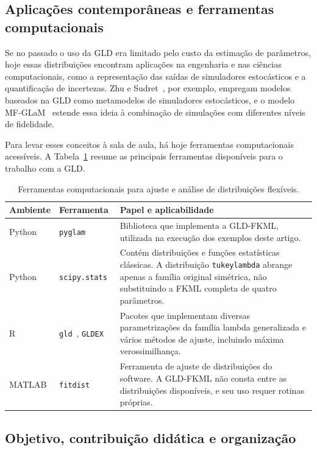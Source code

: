 \subsection{Aplicações contemporâneas e ferramentas computacionais}

Se no passado o uso da GLD era limitado pelo custo da estimação de parâmetros, hoje essas distribuições encontram aplicações na engenharia e nas ciências computacionais, como a representação das saídas de simuladores estocásticos e a quantificação de incertezas. Zhu e Sudret~\cite{zhu2021}, por exemplo, empregam modelos baseados na GLD como metamodelos de simuladores estocásticos, e o modelo MF-GLaM~\cite{giannoukou2026} estende essa ideia à combinação de simulações com diferentes níveis de fidelidade.

Para levar esses conceitos à sala de aula, há hoje ferramentas computacionais acessíveis. A Tabela~\ref{tab:ferramentas} resume as principais ferramentas disponíveis para o trabalho com a GLD.

\begin{table}[htbp]
\centering
\caption{Ferramentas computacionais para ajuste e análise de distribuições flexíveis.}
\label{tab:ferramentas}
\small
\begin{tabular}{p{1.6cm} p{3.1cm} p{9.3cm}}
\toprule
\textbf{Ambiente} & \textbf{Ferramenta} & \textbf{Papel e aplicabilidade} \\
\midrule
Python & \texttt{pyglam}~\cite{pyglam} & Biblioteca que implementa a GLD-FKML, utilizada na execução dos exemplos deste artigo. \\
Python & \texttt{scipy.stats}~\cite{scipy2020} & Contém distribuições e funções estatísticas clássicas. A distribuição \texttt{tukeylambda} abrange apenas a família original simétrica, não substituindo a FKML completa de quatro parâmetros. \\
R & \texttt{gld}~\cite{KingGld}, \texttt{GLDEX}~\cite{su2007} & Pacotes que implementam diversas parametrizações da família lambda generalizada e vários métodos de ajuste, incluindo máxima verossimilhança. \\
MATLAB & \texttt{fitdist}~\cite{matlabfitdist} & Ferramenta de ajuste de distribuições do software. A GLD-FKML não consta entre as distribuições disponíveis, e seu uso requer rotinas próprias. \\
\bottomrule
\end{tabular}
\end{table}

\subsection{Objetivo, contribuição didática e organização}

